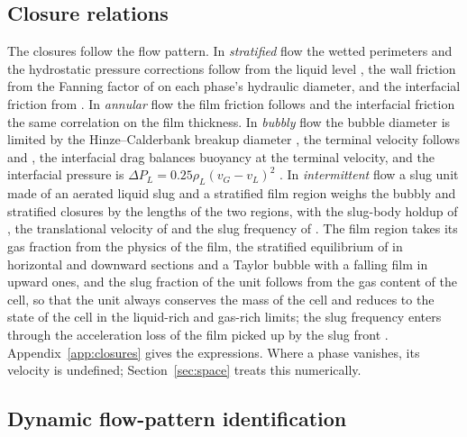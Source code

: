 \documentclass[a4paper,fleqn]{cas-sc}
\begin{document}
\subsection{Closure relations}\label{sec:closures}

The closures follow the flow pattern. In \emph{stratified} flow the wetted perimeters and the hydrostatic pressure corrections follow from the liquid level \citep{taitel1976}, the wall friction from the Fanning factor of \citet{churchill1977} on each phase's hydraulic diameter, and the interfacial friction from \citet{andritsos1987}. In \emph{annular} flow the film friction follows \citet{kowalski1987} and the interfacial friction the same correlation on the film thickness. In \emph{bubbly} flow the bubble diameter is limited by the Hinze--Calderbank breakup diameter \citep{hinze1955}, the terminal velocity follows \citet{mendelson1967} and \citet{fan1990}, the interfacial drag balances buoyancy at the terminal velocity, and the interfacial pressure is $\Delta P_L = 0.25\rho_L (v_G - v_L)^2$ \citep{stuhmiller1977}. In \emph{intermittent} flow a slug unit made of an aerated liquid slug and a stratified film region \citep{taitel1990b} weighs the bubbly and stratified closures by the lengths of the two regions, with the slug-body holdup of \citet{barnea1985}, the translational velocity of \citet{bendiksen1984} and the slug frequency of \citet{zabaras2000}. The film region takes its gas fraction from the physics of the film, the stratified equilibrium of \citet{taitel1976} in horizontal and downward sections and a Taylor bubble with a falling film \citep{taitel1980} in upward ones, and the slug fraction of the unit follows from the gas content of the cell, so that the unit always conserves the mass of the cell and reduces to the state of the cell in the liquid-rich and gas-rich limits; the slug frequency enters through the acceleration loss of the film picked up by the slug front \citep{taitel1990b}. Appendix~\ref{app:closures} gives the expressions. Where a phase vanishes, its velocity is undefined; Section~\ref{sec:space} treats this numerically.

\subsection{Dynamic flow-pattern identification}\label{sec:patterns}
\end{document}
